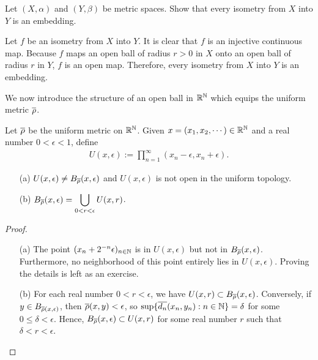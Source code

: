 \begin{prob}
    Let $(X, \alpha)$ and $(Y, \beta)$ be metric spaces.
    Show that every isometry from $X$ into $Y$ is an embedding.
\end{prob}
\begin{sol}
    Let $f$ be an isometry from $X$ into $Y$.
    It is clear that $f$ is an injective continuous map.
    Because $f$ maps an open ball of radius $r>0$ in $X$ onto an open ball of radius $r$ in $Y$, $f$ is an open map.
    Therefore, every isometry from $X$ into $Y$ is an embedding.
\end{sol}

We now introduce the structure of an open ball in ${\mathbb{R}}^{\mathbb{N}}$ which equips the uniform metric $\overline{\rho}$.
\begin{prop}
    Let $\overline{\rho}$ be the uniform metric on ${\mathbb{R}}^{\mathbb{N}}$.
    Given $x=(x_1, x_2, \cdots)\in{\mathbb{R}}^{\mathbb{N}}$ and a real number $0<\epsilon<1$, define
    \begin{align*}
        U(x, \epsilon):=\prod_{n=1}^\infty (x_n-\epsilon, x_n+\epsilon).
    \end{align*}
    \begin{enumerate}
        \item[(a)] $U(x, \epsilon)\neq B_{\overline{\rho}}(x, \epsilon)$ and $U(x, \epsilon)$ is not open in the uniform topology.
        \item[(b)] $\displaystyle{B_{\overline{\rho}}(x, \epsilon)=\bigcup_{0<r<\epsilon} U(x, r)}$.
    \end{enumerate}
\end{prop}
\begin{proof}
    \begin{enumerate}
        \item[(a)]
            The point $(x_n+2^{-n}\epsilon)_{n\in{\mathbb{N}}}$ is in $U(x, \epsilon)$ but not in $B_{\overline{\rho}}(x, \epsilon)$.
            Furthermore, no neighborhood of this point entirely lies in $U(x, \epsilon)$.
            Proving the details is left as an exercise.
        \item[(b)]
            For each real number $0<r<\epsilon$, we have $U(x, r)\subset B_{\overline{\rho}}(x, \epsilon)$.
            Conversely, if $y\in B_{\overline{\rho}(x, \epsilon)}$, then $\overline{\rho}(x, y)<\epsilon$, so $\sup\{\overline{d_n}(x_n, y_n): n\in{\mathbb{N}}\}=\delta$ for some $0\leq\delta<\epsilon$.
            Hence, $B_{\overline{\rho}}(x, \epsilon)\subset U(x, r)$ for some real number $r$ such that $\delta<r<\epsilon$.
    \end{enumerate}
\end{proof}